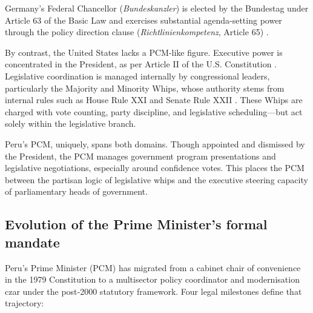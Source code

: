 \documentclass[a4paper, 12pt]{article}
\begin{document}
Germany’s Federal Chancellor (\textit{Bundeskanzler}) is elected by the Bundestag under Article 63 of the Basic Law and exercises substantial agenda-setting power through the policy direction clause (\textit{Richtlinienkompetenz}, Article 65) \citep{federal_republic_of_germany_grundgesetz_1949}.

By contrast, the United States lacks a PCM-like figure. Executive power is concentrated in the President, as per Article II of the U.S. Constitution \citep{united_states_of_america_constitution_1787}. Legislative coordination is managed internally by congressional leaders, particularly the Majority and Minority Whips, whose authority stems from internal rules such as House Rule XXI and Senate Rule XXII \citep{us_house_of_representatives_rules_2023,us_senate_standing_2023}. These Whips are charged with vote counting, party discipline, and legislative scheduling—but act solely within the legislative branch.

Peru's PCM, uniquely, spans both domains. Though appointed and dismissed by the President, the PCM manages government program presentations and legislative negotiations, especially around confidence votes. This places the PCM between the partisan logic of legislative whips and the executive steering capacity of parliamentary heads of government.



\subsection{Evolution of the Prime Minister’s formal mandate} Peru’s Prime Minister (PCM) has migrated from a cabinet chair of convenience in the 1979 Constitution to a multisector policy coordinator and modernisation czar under the post‑2000 statutory framework.  Four legal milestones define that trajectory:
\end{document}
